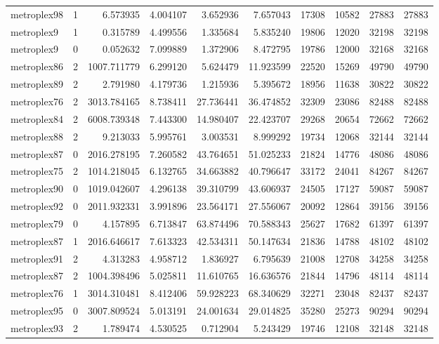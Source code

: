 \begin{longtable}{|l|r|r|r|r|r|r|r|r|r|}
metroplex98 & 1 & 6.573935 & 4.004107 & 3.652936 & 7.657043 & 17308 & 10582 & 27883 & 27883 \\
metroplex9 & 1 & 0.315789 & 4.499556 & 1.335684 & 5.835240 & 19806 & 12020 & 32198 & 32198 \\
metroplex9 & 0 & 0.052632 & 7.099889 & 1.372906 & 8.472795 & 19786 & 12000 & 32168 & 32168 \\
metroplex86 & 2 & 1007.711779 & 6.299120 & 5.624479 & 11.923599 & 22520 & 15269 & 49790 & 49790 \\
metroplex89 & 2 & 2.791980 & 4.179736 & 1.215936 & 5.395672 & 18956 & 11638 & 30822 & 30822 \\
metroplex76 & 2 & 3013.784165 & 8.738411 & 27.736441 & 36.474852 & 32309 & 23086 & 82488 & 82488 \\
metroplex84 & 2 & 6008.739348 & 7.443300 & 14.980407 & 22.423707 & 29268 & 20654 & 72662 & 72662 \\
metroplex88 & 2 & 9.213033 & 5.995761 & 3.003531 & 8.999292 & 19734 & 12068 & 32144 & 32144 \\
metroplex87 & 0 & 2016.278195 & 7.260582 & 43.764651 & 51.025233 & 21824 & 14776 & 48086 & 48086 \\
metroplex75 & 2 & 1014.218045 & 6.132765 & 34.663882 & 40.796647 & 33172 & 24041 & 84267 & 84267 \\
metroplex90 & 0 & 1019.042607 & 4.296138 & 39.310799 & 43.606937 & 24505 & 17127 & 59087 & 59087 \\
metroplex92 & 0 & 2011.932331 & 3.991896 & 23.564171 & 27.556067 & 20092 & 12864 & 39156 & 39156 \\
metroplex79 & 0 & 4.157895 & 6.713847 & 63.874496 & 70.588343 & 25627 & 17682 & 61397 & 61397 \\
metroplex87 & 1 & 2016.646617 & 7.613323 & 42.534311 & 50.147634 & 21836 & 14788 & 48102 & 48102 \\
metroplex91 & 2 & 4.313283 & 4.958712 & 1.836927 & 6.795639 & 21008 & 12708 & 34258 & 34258 \\
metroplex87 & 2 & 1004.398496 & 5.025811 & 11.610765 & 16.636576 & 21844 & 14796 & 48114 & 48114 \\
metroplex76 & 1 & 3014.310481 & 8.412406 & 59.928223 & 68.340629 & 32271 & 23048 & 82437 & 82437 \\
metroplex95 & 0 & 3007.809524 & 5.013191 & 24.001634 & 29.014825 & 35280 & 25273 & 90294 & 90294 \\
metroplex93 & 2 & 1.789474 & 4.530525 & 0.712904 & 5.243429 & 19746 & 12108 & 32148 & 32148 \\

\end{longtable}
